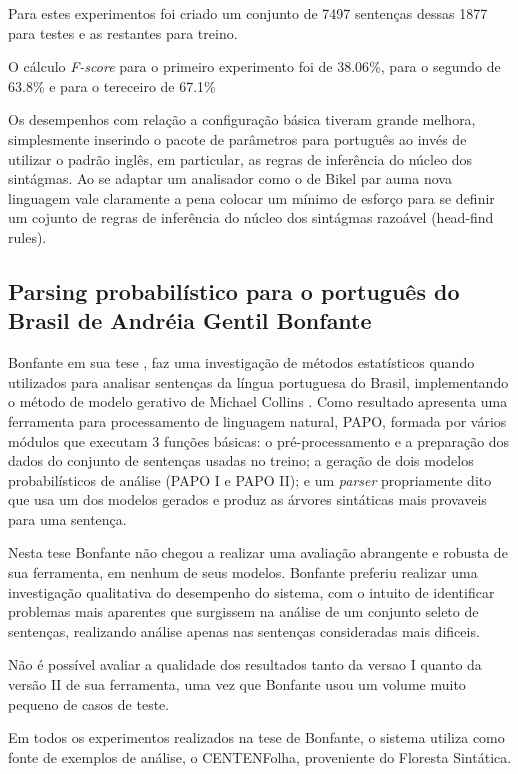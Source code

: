 Para estes experimentos foi criado um conjunto de 7497 sentenças dessas 1877 para testes e as restantes para treino.

O cálculo \emph{F-score} para o primeiro experimento foi de 38.06{\%}, para o segundo de 63.8{\%} e para o tereceiro de 67.1{\%} 

Os desempenhos com relação a configuração básica tiveram grande melhora, simplesmente inserindo o pacote de parâmetros para português ao invés de utilizar o padrão inglês, em particular, as regras de inferência do núcleo dos sintágmas. Ao se adaptar um analisador como o de Bikel par auma nova linguagem vale claramente a pena colocar um mínimo de esforço para se definir um cojunto de regras de inferência do núcleo dos sintágmas razoável (head-find rules).

\subsection{Parsing probabilístico para o português do Brasil de Andréia Gentil Bonfante} %
\label{sec:bonfante}

Bonfante em sua tese \cite{bonfante03}, faz uma investigação de métodos estatísticos quando utilizados para analisar sentenças da língua portuguesa do Brasil, implementando o método de modelo gerativo de Michael Collins \cite{collins99}. Como resultado apresenta uma ferramenta para processamento de linguagem natural, PAPO, formada por vários módulos que executam 3 funções básicas: o pré-processamento e a preparação dos dados do conjunto de sentenças usadas no treino; a geração de dois modelos probabilísticos de análise (PAPO I e PAPO II); e um \emph{parser} propriamente dito que usa um dos modelos gerados e produz as árvores sintáticas mais provaveis para uma sentença.

Nesta tese Bonfante não chegou a realizar uma avaliação abrangente e robusta de sua ferramenta, em nenhum de seus modelos. Bonfante preferiu realizar uma investigação qualitativa do desempenho do sistema, com o intuito de identificar problemas mais aparentes que surgissem na análise de um conjunto seleto de sentenças, realizando análise apenas nas sentenças consideradas mais dificeis.

Não é possível avaliar a qualidade dos resultados tanto da versao I quanto da versão II de sua ferramenta, uma vez que Bonfante usou um volume muito pequeno de casos de teste.

Em todos os experimentos realizados na tese de Bonfante, o sistema utiliza como fonte de exemplos de análise, o CENTENFolha, proveniente do Floresta Sintática.

